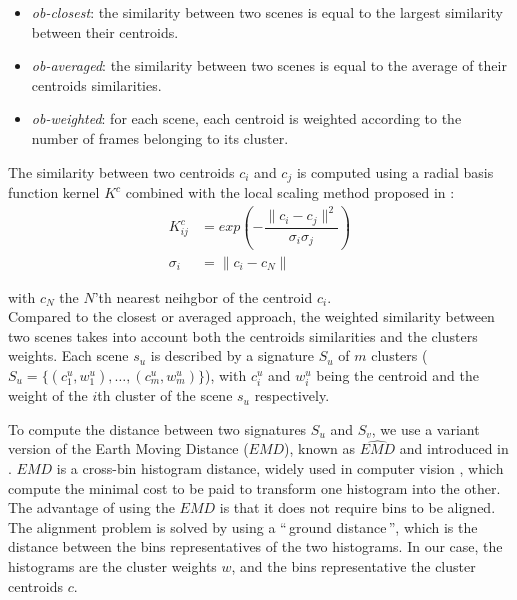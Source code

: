 \documentclass[journal]{IEEEtran}
\begin{document}
\begin{itemize}
\item \emph{ob-closest}: the similarity between two scenes is equal to the largest similarity between their centroids.
\item \emph{ob-averaged}: the similarity between two scenes is equal to the average of their centroids similarities.
\item \emph{ob-weighted}: for each scene, each centroid is weighted according to the number of frames belonging to its cluster.\\
\end{itemize}

The similarity between two centroids $c_i$ and $c_j$ is computed using a radial basis function kernel $K^c$ combined with the local scaling method proposed in \cite{selfTuneManor2004}: \\
\begin{equation}
\label{eq:kc}
\begin{split}
K^c_{ij} & =exp\left( - \dfrac{\parallel c_i - c_j \parallel^2}{\sigma_{i}\sigma_{j}} \right) \\
\sigma_{i} & =\parallel c_i - c_N \parallel
\end{split}
\end{equation}

with $c_N$ the $N$'th nearest neihgbor of the centroid $c_i$. \\

Compared to the closest or averaged approach, the  weighted similarity between two scenes takes into account both the centroids similarities and the clusters weights. Each scene $s_u$ is described by a signature $S_u$ of $m$ clusters ($S_u=\lbrace(c_1^u,w_1^u),\ldots,(c_m^u,w_m^u)\rbrace$), with $c_i^u$ and $w_i^u$ being the centroid and the weight of the $i$th cluster of the scene $s_u$ respectively. 

To compute the distance between two signatures $S_u$ and $S_v$, we use a variant version of the Earth Moving Distance ($EMD$), known as $\widehat{EMD}$ and introduced in \cite{pele2008linear}. $EMD$ is a cross-bin histogram distance, widely used in computer vision \cite{zhang2007local}, which compute the minimal cost to be paid to transform one histogram into the other. The advantage of using the $EMD$ is that it does not require bins to be aligned. The alignment problem is solved by using a ``\,ground distance\,'', which is the distance between the bins representatives of the two histograms. In our case, the histograms are the cluster weights $w$, and the bins representative the cluster centroids $c$.\\
\end{document}
